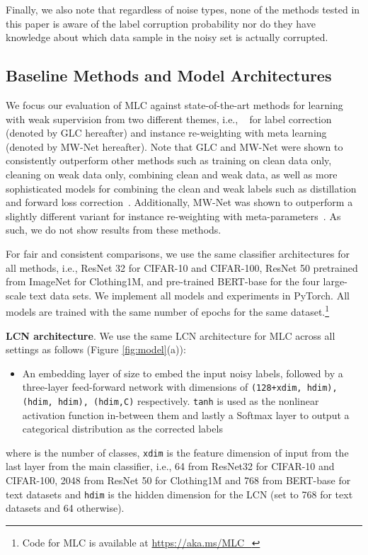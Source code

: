 Finally, we also note that regardless of noise types, none of the methods tested in this paper is aware of the label corruption probability  nor do they have knowledge about which data sample in the noisy set is actually corrupted.


\subsection{Baseline Methods and Model Architectures}

We focus our evaluation of MLC against state-of-the-art
methods for learning with weak supervision from two different themes,
i.e., ~\cite{hendrycks2018using} for label correction (denoted by GLC
hereafter) and instance re-weighting with meta learning
~\cite{shu2019meta} (denoted by MW-Net hereafter). Note that GLC and MW-Net were shown to consistently outperform other methods such as training on clean data only, cleaning on weak data only, combining clean and weak data, as well as more sophisticated  models for combining the clean and weak labels such as distillation \cite{Li_2017_ICCV} and forward loss correction~\cite{sukhbaatar2014training}. Additionally,
MW-Net was shown to outperform a slightly different variant for
instance re-weighting with meta-parameters~\cite{ren2018learning}. As
such, we do not show results from these methods.


For fair and consistent comparisons, we use the same classifier
architectures for all methods, i.e., ResNet 32 for CIFAR-10 and
CIFAR-100, ResNet 50 pretrained from ImageNet for Clothing1M, and
pre-trained BERT-base for the four large-scale text data sets. We
implement all models and experiments in PyTorch. All models are
trained with the same number of epochs for the same
dataset.\footnote{Code for MLC is available at \url{https://aka.ms/MLC_}}


\textbf{LCN architecture}. We use the same LCN architecture for MLC
across all settings as follows (Figure \ref{fig:model}(a)):
\begin{itemize}
    \item[] An embedding layer of size  to embed the input noisy labels,
    followed by a three-layer feed-forward network with dimensions of \texttt{(128+xdim, hdim), (hdim, hdim), (hdim,C)} respectively. \texttt{tanh} is used as the nonlinear activation function in-between them and lastly a Softmax layer to output a categorical distribution as the corrected labels
\end{itemize}
where  is the number of classes, \texttt{xdim} is the feature dimension of input  from
the last layer from the main classifier, i.e., 64 from ResNet32 for CIFAR-10
and CIFAR-100, 2048 from ResNet 50 for Clothing1M and 768 from
BERT-base for text datasets and \texttt{hdim} is the hidden dimension
for the LCN (set to 768 for text datasets and 64 otherwise).



